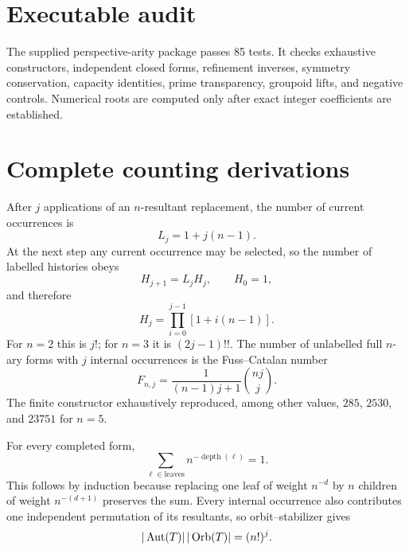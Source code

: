 \documentclass[11pt,a4paper]{article}
\begin{document}
\section{Executable audit}
The supplied perspective-arity package passes 85 tests. It checks exhaustive constructors, independent closed forms, refinement inverses, symmetry conservation, capacity identities, prime transparency, groupoid lifts, and negative controls. Numerical roots are computed only after exact integer coefficients are established.


\section{Complete counting derivations}
After $j$ applications of an $n$-resultant replacement, the number of current occurrences is
\begin{equation}
L_j=1+j(n-1).
\end{equation}
At the next step any current occurrence may be selected, so the number of labelled histories obeys
\begin{equation}
H_{j+1}=L_jH_j,\qquad H_0=1,
\end{equation}
and therefore
\begin{equation}
H_j=\prod_{i=0}^{j-1}[1+i(n-1)].
\end{equation}
For $n=2$ this is $j!$; for $n=3$ it is $(2j-1)!!$. The number of unlabelled full $n$-ary forms with $j$ internal occurrences is the Fuss--Catalan number
\begin{equation}
F_{n,j}=\frac{1}{(n-1)j+1}\binom{nj}{j}.
\end{equation}
The finite constructor exhaustively reproduced, among other values, $285$, $2530$, and $23751$ for $n=5$.

For every completed form,
\begin{equation}
\sum_{\ell\in\mathrm{leaves}}n^{-\operatorname{depth}(\ell)}=1.
\end{equation}
This follows by induction because replacing one leaf of weight $n^{-d}$ by $n$ children of weight $n^{-(d+1)}$ preserves the sum. Every internal occurrence also contributes one independent permutation of its resultants, so orbit--stabilizer gives
\begin{equation}
|\operatorname{Aut}(T)|\,|\operatorname{Orb}(T)|=(n!)^j.
\end{equation}
\end{document}
